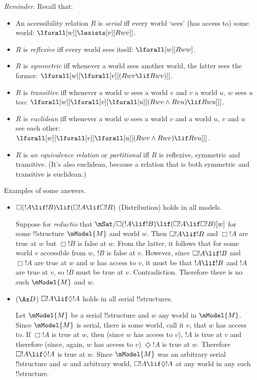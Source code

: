\documentclass[../../../../include/open-logic-section]{subfiles}
\begin{document}
\begin{prob}
\emph{Reminder}. Recall that: 

\begin{itemize}
	\item An accessibility relation $R$ is \emph{serial} iff every world `sees' 
	(has access to) some world: $\lforall[w][\lexists[v][Rwv]]$.
	\item $R$ is \emph{reflexive} iff every world sees itself: $\lforall[w][Rww]$.
	\item $R$ is \emph{symmetric} iff whenever a world sees another world, the latter 
	sees the former: $\lforall[w][\lforall[v][(Rwv \lif Rwv)]]$.
	\item $R$ is \emph{transitive} iff whenever a world $w$ sees a world $v$ and $v$ a world $u$, $w$ sees $u$ too: $\lforall[w][\lforall[v][\lforall[u][(Rwv \land Rvu) \lif Rwu]]]$.
	\item $R$ is \emph{euclidean} iff whenever a world $w$ sees a world $v$ and a world $u$, $v$ and $u$ see each other: $\lforall[w][\lforall[v][\lforall[u][(Rwv \land Rwv) \lif Rvu]]]$.
	\item $R$ is \emph{an equivalence relation} or \emph{partitional} iff $R$ is reflexive,
	symmetric and transitive. (It's also euclidean, because a relation that is both symmetric and transitive is euclidean.)
\end{itemize}

	\begin{ans} Examples of some answers.
	\begin{itemize} 
		\item $\Box(!A \lif !B)\lif(\Box !A \lif \Box !B)$ (Distribution)
		holds in all models.

		Suppose for \emph{reductio} that $\mSat/{\Box(!A \lif
		!B)\lif(\Box !A \lif \Box !B)}[w]$ for some !!{structure}
		$\mModel{M}$ and world $w$. Then $\Box!A\lif!B$ and $\Box!A$
		are true at $w$ but $\Box!B$ is false at $w$. From the latter,
		it follows that for some world $v$ accessible from $w$, 
		$!B$ is false at $v$. However, since  $\Box!A\lif!B$ and
		 $\Box!A$ are true at $w$ and $w$ has access to $v$, it must
		 be that $!A\lif!B$ and $!A$ are true at $v$, so $!B$ must
		 be true at $v$. Contradiction. Therefore there is no such 
		$\mModel{M}$ and $w$.

		\item ($\Ax D$) $\Box !A \lif \Diamond !A$ holds in all serial !!{structure}s.
		
		Let $\mModel{M}$ be a serial !!{structure} and $w$ any world in
		$\mModel{M}$. Since $\mModel{M}$ is serial, there is some world,
		call it $v$, that $w$ has access to. If $\Box!A$ is true at $w$,
		then (since $w$ has access to $v$), $!A$ is true at $v$ and
		therefore (since, again, $w$ has access to $v$) $\Diamond!A$ is 
		true at $w$. Therefore $\Box!A\lif\Diamond!A$ is true at $w$.
		Since  $\mModel{M}$ was an arbitrary serial !!{structure} and $w$ 
		and arbitrary world, $\Box !A \lif \Diamond !A$ at any world in 
		any such !!{structure}. 


\end{itemize}
\end{ans}
\end{prob}
\end{document}
